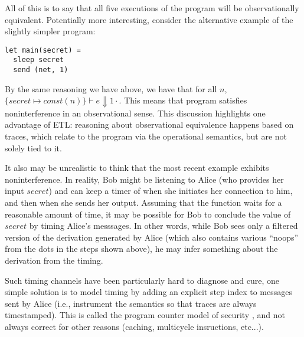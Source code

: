 \documentclass[conference]{IEEEtran}
\newcommand{\code}[1]{\text{\lstinline!#1!}}
\theoremstyle{definition}
\newcommand{\aset}[1]{\{#1\}}
\newcommand{\judge}{\vdash}
\begin{document}
All of this is to say that all five executions of the program will be
observationally equivalent.  Potentially more interesting, consider
the alternative example of the slightly simpler program:

\begin{lstlisting}
let main(secret) =
  sleep secret
  send (net, 1)
\end{lstlisting}

By the same reasoning we have above, we have that for all $n$,
$\aset{secret\mapsto const(n)} \judge e \Downarrow 1 \cdot$.  This
means that program satisfies noninterference in an observational
sense.  This discussion highlights one advantage of ETL: reasoning
about observational equivalence happens based on traces, which relate
to the program via the operational semantics, but are not solely tied
to it.

It also may be unrealistic to think that the most recent example
exhibits noninterference.  In reality, Bob might be listening to Alice
(who provides her input $secret$) and can keep a timer of when she
initiates her connection to him, and then when she sends her output.
Assuming that the \code{sleep} function waits for a reasonable amount
of time, it may be possible for Bob to conclude the value of $secret$
by timing Alice's messsages.  In other words, while Bob sees only a
filtered version of the derivation generated by Alice (which also
contains various ``noops'' from the dots in the steps shown above), he
may infer something about the derivation from the timing.

Such timing channels have been particularly hard to diagnose and cure,
one simple solution is to model timing by adding an explicit step
index to messages sent by Alice (i.e., instrument the semantics so
that traces are always timestamped).  This is called the program
counter model of security \cite{pcmodel}, and not always correct for
other reasons (caching, multicycle insructions, etc...).
\end{document}
